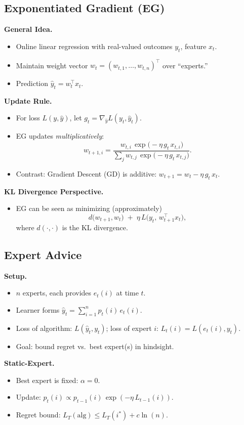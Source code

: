 \documentclass[10pt]{article}
\begin{document}
\begin{multicols}{2}
\subsection*{Exponentiated Gradient (EG)}

\textbf{General Idea.}
\begin{itemize}
\item Online linear regression with real-valued outcomes $y_t$, feature $x_t$.
\item Maintain weight vector $w_t=(w_{t,1},\dots,w_{t,n})^\top$ over ``experts.''
\item Prediction $\hat{y}_t = w_t^\top x_t$.
\end{itemize}

\textbf{Update Rule.}
\begin{itemize}
\item For loss $L(y,\hat{y})$, let $g_t=\nabla_{\hat{y}} L(y_t,\hat{y}_t)$. 
\item EG updates \emph{multiplicatively}:
\[
w_{t+1,i}
= \frac{\,w_{t,i}\,\exp\bigl(-\eta\,g_t\,x_{t,i}\bigr)}
{\sum_{j} w_{t,j}\,\exp\bigl(-\eta\,g_t\,x_{t,j}\bigr)}.
\]
\item Contrast: Gradient Descent (GD) is additive: $w_{t+1}=w_t -\eta\,g_t\,x_t$.
\end{itemize}

\textbf{KL Divergence Perspective.}
\begin{itemize}
\item EG can be seen as minimizing (approximately)
\[
d\bigl(w_{t+1}, w_t\bigr)\;+\;\eta\, L\bigl(y_t,\,w_{t+1}^\top x_t\bigr),
\]
where $d(\cdot,\cdot)$ is the KL divergence.
\end{itemize}

\subsection*{Expert Advice}

\textbf{Setup.}
\begin{itemize}
\item $n$ experts, each provides $e_t(i)$ at time $t$.
\item Learner forms $\hat{y}_t = \sum_{i=1}^n p_t(i)\,e_t(i)$.
\item Loss of algorithm: $L(\hat{y}_t,y_t)$; loss of expert $i$: $L_t(i)=L(e_t(i),y_t)$.
\item Goal: bound regret vs.\ best expert(s) in hindsight.
\end{itemize}

\textbf{Static-Expert.}
\begin{itemize}
\item Best expert is fixed: $\alpha=0$.
\item Update: $p_t(i)\propto p_{t-1}(i)\,\exp(-\eta\,L_{t-1}(i))$.
\item Regret bound: $L_T(\text{alg})\le L_T(i^*)+c\ln(n)$.
\end{itemize}


\end{multicols}
\end{document}
